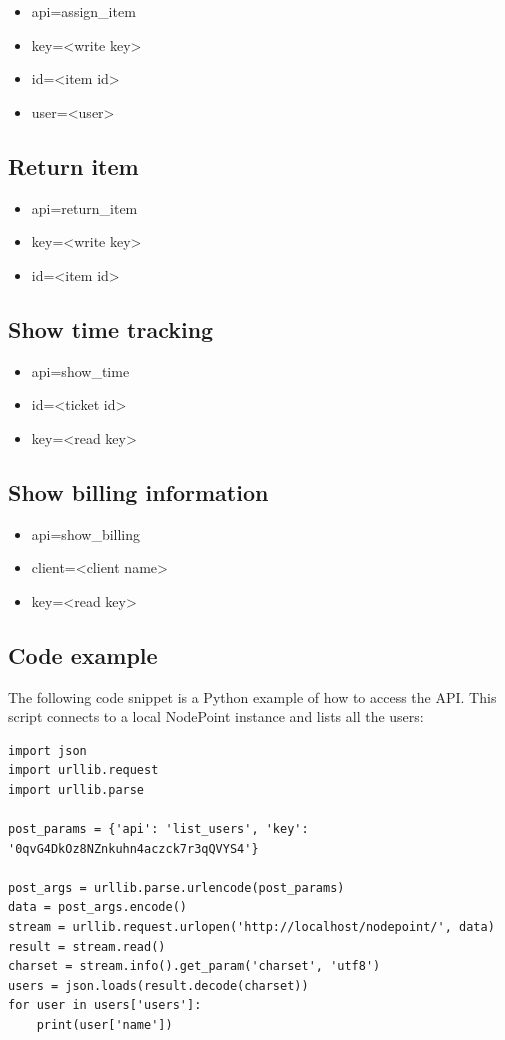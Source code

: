 \documentclass[11pt]{article}
\begin{document}
\begin{itemize}
\item api=assign\_item
\item key=<write key>
\item id=<item id>
\item user=<user>
\end{itemize}

\subsection{Return item}

\begin{itemize}
\item api=return\_item
\item key=<write key>
\item id=<item id>
\end{itemize}

\subsection{Show time tracking}

\begin{itemize}
\item api=show\_time
\item id=<ticket id>
\item key=<read key>
\end{itemize}

\subsection{Show billing information}

\begin{itemize}
\item api=show\_billing
\item client=<client name>
\item key=<read key>
\end{itemize}

\subsection{Code example}
The following code snippet is a Python example of how to access the API. This script connects to a local NodePoint instance and lists all the users:

\begin{lstlisting}
import json
import urllib.request
import urllib.parse

post_params = {'api': 'list_users', 'key': '0qvG4DkOz8NZnkuhn4aczck7r3qQVYS4'}

post_args = urllib.parse.urlencode(post_params)
data = post_args.encode()
stream = urllib.request.urlopen('http://localhost/nodepoint/', data)
result = stream.read()
charset = stream.info().get_param('charset', 'utf8')
users = json.loads(result.decode(charset))
for user in users['users']:
    print(user['name'])
\end{lstlisting}
\end{document}
